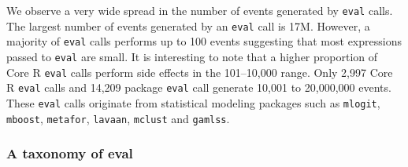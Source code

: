 \documentclass[USenglish,cleveref, autoref, thm-restate]{lipics-v2019}
\newcommand{\EventsMaxCountRnd}{17M\xspace}
\newcommand{\EventsMaxRangeA}{100\xspace}
\newcommand{\EventsMinRangeB}{101\xspace}
\newcommand{\EventsMaxRangeB}{10,000\xspace}
\newcommand{\EventsMinRangeC}{10,001\xspace}
\newcommand{\EventsMaxRangeC}{20,000,000\xspace}
\newcommand{\EventsCoreEvalCountC}{2,997\xspace}
\newcommand{\EventsPackageEvalCountC}{14,209\xspace}
\newcommand{\eval}{\texttt{eval}\xspace}
\newcommand{\mlogit}{\c{mlogit}}
\newcommand{\mboost}{\c{mboost}}
\newcommand{\metafor}{\c{metafor}}
\newcommand{\lavaan}{\c{lavaan}}
\newcommand{\mclust}{\c{mclust}}
\newcommand{\gamlss}{\c{gamlss}}
\renewcommand{\c}[1]{\lstinline{#1}\xspace}
\begin{document}
We observe a very wide spread in the number of events generated by \eval
calls. The largest number of events generated by an \eval call is
\EventsMaxCountRnd.  However, a majority of \eval calls performs up to
\EventsMaxRangeA events suggesting that most expressions passed to \eval are
small.  It is interesting to note that a higher proportion of Core R \eval
calls perform side effects in the \EventsMinRangeB--\EventsMaxRangeB range.
Only \EventsCoreEvalCountC Core R \eval calls and \EventsPackageEvalCountC
package \eval call generate \EventsMinRangeC to \EventsMaxRangeC events.
These \eval calls originate from statistical modeling packages such as
\mlogit, \mboost, \metafor, \lavaan, \mclust and \gamlss.


\subsubsection{A taxonomy of eval}

\end{document}
